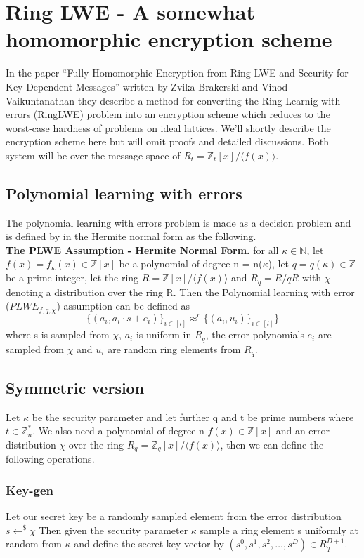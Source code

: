 \documentclass[../main.tex]{subfiles}
\begin{document}
    \section{Ring LWE - A somewhat homomorphic encryption scheme}
    In the paper ``Fully Homomorphic Encryption from Ring-LWE and Security for Key Dependent Messages'' written by
    Zvika Brakerski and Vinod Vaikuntanathan \cite{brakerski2011fully}
    they describe a method for converting the Ring Learnig with errors (RingLWE) problem into an encryption scheme
    which reduces to the worst-case hardness of problems on ideal lattices.
    We'll shortly describe the encryption scheme here but will omit proofs and detailed discussions.
    Both system will be over the message space of $R_t = \mathbb{Z}_t[x] / \langle f(x) \rangle $.

    \subsection{Polynomial learning with errors}
    The polynomial learning with errors problem is made as a decision problem
    and is defined by in the Hermite normal form as the following.
    \\[2mm]
    \textbf{The PLWE Assumption - Hermite Normal Form.}
    for all $\kappa \in \mathbb{N}$, let $f(x) = f_{\kappa}(x) \in \mathbb{Z}[x]$
    be a polynomial of degree n = n($\kappa$), let $q = q(\kappa) \in \mathbb{Z}$
    be a prime integer, let the ring $R = \mathbb{Z}[x] / \langle f(x) \rangle$
    and $R_q = R / qR$ with $\chi$ denoting a distribution over the ring R. 
    Then the Polynomial learning with error ($PLWE_{f,q,\chi}$) assumption can be defined as
    $$
        \{ (a_i, a_i \cdot s + e_i) \}_{i \in [l]} \approx^{c} \{(a_i, u_i) \}_{i \in [l]}\}
    $$
    where s is sampled from $\chi$, $a_i$ is uniform in $R_q$, the error polynomials
    $e_i$ are sampled from $\chi$ and $u_i$ are random ring elements from $R_q$.

    \subsection{Symmetric version}
    Let $\kappa$ be the security parameter and let further q and t be prime numbers where $t \in \mathbb{Z}_n^*$.
    We also need a polynomial of degree n $f(x) \in \mathbb{Z}[x]$ and an error distribution $\chi$ over the ring
    $R_q = \mathbb{Z}_q[x] / \langle f(x) \rangle$, then we can define the following operations.

    \subsubsection{Key-gen}
    Let our secret key be a randomly sampled element from the error distribution $s \leftarrow^\$ \chi$
    Then given the security parameter $\kappa$ sample a ring element s uniformly at random from $\kappa$ and define the
    secret key vector by $(s^0, s^1, s^2, \dots, s^D) \in R_q^{D+1}$.
\end{document}
